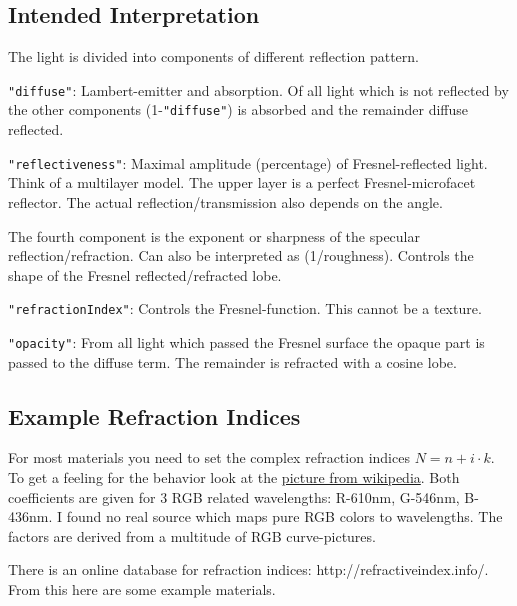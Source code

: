 \documentclass[english,10pt,a4paper,twocolumn,colorscheme=green]{orarticle}
\begin{document}
	\subsection{Intended Interpretation}
	The light is divided into components of different reflection pattern.
	
	\lstinline|"diffuse"|: Lambert-emitter and absorption. Of all light which is not reflected by the other components (1-\lstinline|"diffuse"|) is absorbed and the remainder diffuse reflected.
	
	\lstinline|"reflectiveness"|: Maximal amplitude (percentage) of Fresnel-reflected light. Think of a multilayer model. The upper layer is a perfect Fresnel-microfacet reflector. The actual reflection/transmission also depends on the angle.
	
	The fourth component is the exponent or sharpness of the specular reflection/refraction. Can also be interpreted as (1/roughness). Controls the shape of the Fresnel reflected/refracted lobe.
	
	\lstinline|"refractionIndex"|: Controls the Fresnel-function. This cannot be a texture.
	
	\lstinline|"opacity"|: From all light which passed the Fresnel surface the opaque part is passed to the diffuse term. The remainder is refracted with a cosine lobe. %
	
	\subsection{Example Refraction Indices}
	For most materials you need to set the complex refraction indices $N = n + i \cdot k$. To get a feeling for the behavior look at the \href{	http://de.wikipedia.org/wiki/Fresnelsche\_Formeln\#mediaviewer/File:Fresnel\_reflection\_coefficients\_\%28DE\%29.svg}{picture from wikipedia}. Both coefficients are given for 3 RGB related wavelengths: R-610nm, G-546nm, B-436nm. I found no real source which maps pure RGB colors to wavelengths. The factors are derived from a multitude of RGB curve-pictures.
	
	There is an online database for refraction indices: http://refractiveindex.info/.
	From this here are some example materials.
	
\end{document}
